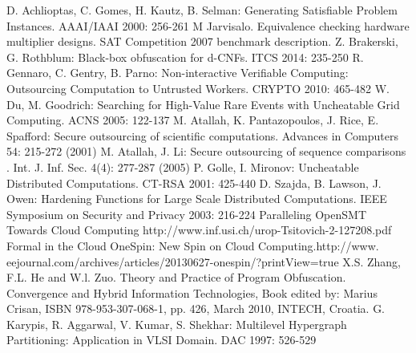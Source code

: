 \documentclass[conference,compsocconf]{IEEEtran}
\begin{document}
\begin{thebibliography}{26}
D. Achlioptas, C. Gomes, H. Kautz, B. Selman: Generating Satisfiable Problem Instances. AAAI/IAAI 2000: 256-261
M Jarvisalo. Equivalence checking hardware multiplier designs.
SAT Competition 2007 benchmark description.
Z. Brakerski, G. Rothblum: Black-box obfuscation for d-CNFs. ITCS 2014: 235-250
R. Gennaro, C. Gentry, B. Parno: Non-interactive Verifiable Computing: Outsourcing Computation to Untrusted Workers. CRYPTO 2010: 465-482
W. Du, M. Goodrich: Searching for High-Value Rare Events with Uncheatable Grid Computing. ACNS 2005: 122-137
M. Atallah, K. Pantazopoulos, J. Rice, E. Spafford: Secure outsourcing of scientific computations. Advances in Computers 54: 215-272 (2001)
M. Atallah, J. Li: Secure outsourcing of sequence comparisons . Int. J. Inf. Sec. 4(4): 277-287 (2005)
P. Golle, I. Mironov: Uncheatable Distributed Computations. CT-RSA 2001: 425-440
D. Szajda, B. Lawson, J. Owen: Hardening Functions for Large Scale Distributed Computations. IEEE Symposium on Security and Privacy 2003: 216-224
Paralleling OpenSMT Towards Cloud Computing http://www.inf.usi.ch/urop-Tsitovich-2-127208.pdf
Formal in the Cloud OneSpin: New Spin on Cloud Computing.http://www. eejournal.com/archives/articles/20130627-onespin/?printView=true
X.S. Zhang, F.L. He and W.l. Zuo. Theory and Practice of Program Obfuscation.
Convergence and Hybrid Information Technologies, Book edited by: Marius Crisan, ISBN 978-953-307-068-1, pp. 426, March 2010, INTECH, Croatia.
G. Karypis, R. Aggarwal, V. Kumar, S. Shekhar: Multilevel Hypergraph Partitioning: Application in VLSI Domain. DAC 1997: 526-529

\end{thebibliography}



\end{document}
